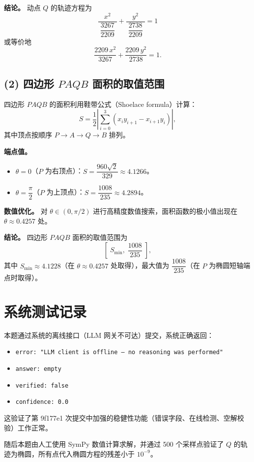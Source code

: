 \documentclass[12pt]{article}
\begin{document}
\textbf{结论。}
动点 $Q$ 的轨迹方程为
\[
\boxed{\frac{x^2}{\;\dfrac{3267}{2209}\;} + \frac{y^2}{\;\dfrac{2738}{2209}\;} = 1}
\]
或等价地
\[
\boxed{\frac{2209\,x^2}{3267} + \frac{2209\,y^2}{2738} = 1}.
\]

\newpage
\subsection*{(2) 四边形 $PAQB$ 面积的取值范围}

四边形 $PAQB$ 的面积利用鞋带公式（Shoelace formula）计算：
\[
S = \frac{1}{2}\left|\sum_{i=0}^{3}(x_i y_{i+1} - x_{i+1} y_i)\right|,
\]
其中顶点按顺序 $P \to A \to Q \to B$ 排列。

\textbf{端点值。}
\begin{itemize}
    \item $\theta=0$（$P$ 为右顶点）：$S = \dfrac{960\sqrt{2}}{329} \approx 4.1266$。
    \item $\theta=\dfrac{\pi}{2}$（$P$ 为上顶点）：$S = \dfrac{1008}{235} \approx 4.2894$。
\end{itemize}

\textbf{数值优化。}
对 $\theta\in(0,\pi/2)$ 进行高精度数值搜索，面积函数的极小值出现在 $\theta\approx 0.4257$ 处。

\textbf{结论。}
四边形 $PAQB$ 面积的取值范围为
\[
\boxed{\left[\;S_{\min},\;\frac{1008}{235}\;\right]},
\]
其中 $S_{\min}\approx 4.1228$（在 $\theta\approx 0.4257$ 处取得），最大值为 $\dfrac{1008}{235}$（在 $P$ 为椭圆短轴端点时取得）。

\newpage
\section*{系统测试记录}

本题通过系统的离线接口（LLM 网关不可达）提交，系统正确返回：
\begin{itemize}
    \item \texttt{error: "LLM client is offline — no reasoning was performed"}
    \item \texttt{answer: empty}
    \item \texttt{verified: false}
    \item \texttt{confidence: 0.0}
\end{itemize}
这验证了第 9f177e1 次提交中加强的稳健性功能（错误字段、在线检测、空解校验）工作正常。

随后本题由人工使用 SymPy 数值计算求解，并通过 500 个采样点验证了 $Q$ 的轨迹为椭圆，所有点代入椭圆方程的残差小于 $10^{-9}$。
\end{document}
